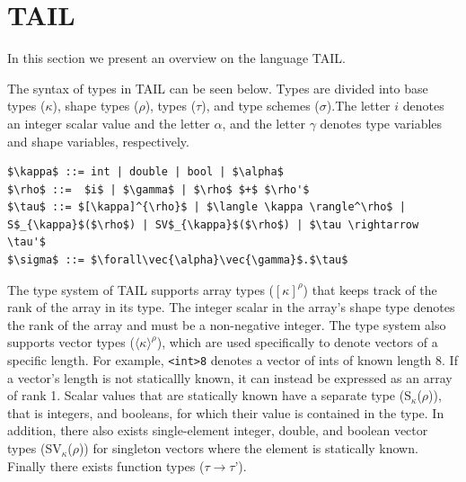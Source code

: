 \documentclass[11pt]{article}
\begin{document}




\section{TAIL}
\label{sec:tail}

In this section we present an overview on the language TAIL.

The syntax of types in TAIL can be seen below. Types are divided into base types ($\kappa$), shape types ($\rho$), types ($\tau$), and type schemes ($\sigma$).The letter $i$ denotes an integer scalar value and the letter $\alpha$, and the letter $\gamma$ denotes type variables and shape variables, respectively.
\begin{lstlisting}[numbers=none,frame=none]
$\kappa$ ::= int | double | bool | $\alpha$
$\rho$ ::=  $i$ | $\gamma$ | $\rho$ $+$ $\rho'$
$\tau$ ::= $[\kappa]^{\rho}$ | $\langle \kappa \rangle^\rho$ | S$_{\kappa}$($\rho$) | SV$_{\kappa}$($\rho$) | $\tau \rightarrow \tau'$
$\sigma$ ::= $\forall\vec{\alpha}\vec{\gamma}$.$\tau$
\end{lstlisting}
The type system of TAIL supports array types ($[\kappa]^{\rho}$) that keeps track of the rank of the array in its type.
The integer scalar in the array's shape type denotes the rank of the array and must be a non-negative integer.
The type system also supports vector types ($\langle \kappa \rangle^\rho$), which are used specifically to denote vectors of a specific length. For example, {\tt <int>8} denotes a vector of ints of known length 8. If a vector's length is not staticallly known, it can instead be expressed as an array of rank 1.
Scalar values that are statically known have a separate type (S$_{\kappa}$($\rho$)), that is integers, and booleans,
for which their value is contained in the type.
In addition, there also exists single-element integer, double, and boolean vector types (SV$_{\kappa}$($\rho$)) for singleton vectors where the element is statically known.
Finally there exists function types ($\tau \rightarrow \tau$').
\end{document}
